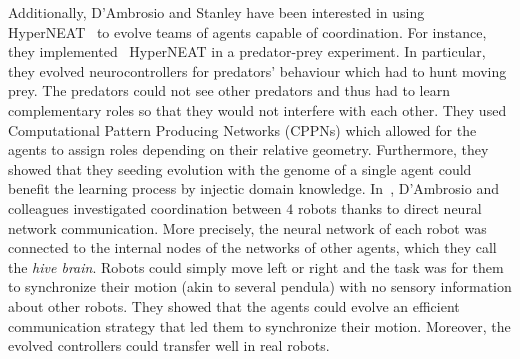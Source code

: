     Additionally, D'Ambrosio and Stanley have been interested in using HyperNEAT~\parencite{Stanley2009a} to evolve teams of agents capable of coordination. For instance, they implemented~\parencite{DAmbrosio2008} HyperNEAT in a predator-prey experiment. In particular, they evolved neurocontrollers for predators' behaviour which had to hunt moving prey. The predators could not see other predators and thus had to learn complementary roles so that they would not interfere with each other. They used Computational Pattern Producing Networks (CPPNs) which allowed for the agents to assign roles depending on their relative geometry. Furthermore, they showed that they seeding evolution with the genome of a single agent could benefit the learning process by injectic domain knowledge. In~\parencite{DAmbrosio2012}, D'Ambrosio and colleagues investigated coordination between $4$ robots thanks to direct neural network communication. More precisely, the neural network of each robot was connected to the internal nodes of the networks of other agents, which they call the \emph{hive brain}. Robots could simply move left or right and the task was for them to synchronize their motion (akin to several pendula) with no sensory information about other robots. They showed that the agents could evolve an efficient communication strategy that led them to synchronize their motion. Moreover, the evolved controllers could transfer well in real robots.


